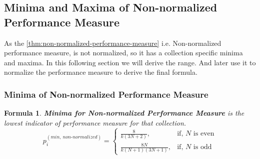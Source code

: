 \documentclass[a4paper,fleqn,review]{cas-sc}
\newtheorem{theorem}{Formula}
\begin{document}
\subsection{Minima and Maxima of Non-normalized Performance Measure}
As the \autoref{thm:non-normalized-performance-measure} i.e. Non-normalized performance measure, is not normalized, so it has a collection specific minima and maxima. In this following section we will derive the range. And later use it to normalize the performance measure to derive the final formula.
\subsubsection{Minima of Non-normalized Performance Measure}
\begin{theorem}\label{thm:non-normalized-minima}
	\textbf{Minima for Non-normalized Performance Measure} is the lowest indicator of performance measure for that collection.
	\begin{equation}
		p_i^{(min, \, non\text{-}normalized)} =
		\begin{cases}
			\frac{8}{k(3N + 2)}, & \text{if, } N \text{ is even} \\
			\frac{8N}{k (N+1)(3N+1)}, & \text{if, } N \text{ is odd}
		\end{cases}
	\end{equation}
\end{theorem}
\end{document}
